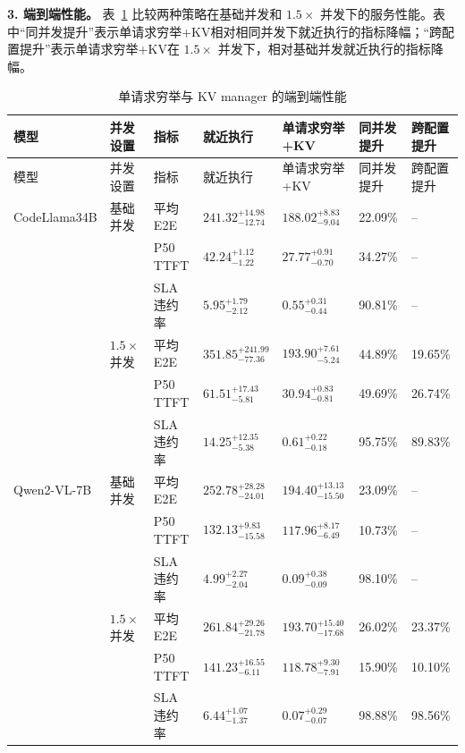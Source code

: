 \medskip
\noindent\textbf{3. 端到端性能。}
表~\ref{tab:offloading-preliminary-results} 比较两种策略在基础并发和 \(1.5\times\) 并发下的服务性能。表中“同并发提升”表示单请求穷举+KV相对相同并发下就近执行的指标降幅；“跨配置提升”表示单请求穷举+KV在 \(1.5\times\) 并发下，相对基础并发就近执行的指标降幅。

\begingroup
\scriptsize
\setlength{\tabcolsep}{2pt}
\begin{longtable}{p{}p{}>{\raggedright\arraybackslash}p{}p{}p{}p{}p{}}
\caption{单请求穷举与 KV manager 的端到端性能}
\label{tab:offloading-preliminary-results}\\
\toprule
模型 & 并发设置 & 指标 & 就近执行 & 单请求穷举+KV & 同并发提升 & 跨配置提升 \\
\midrule
\endfirsthead
\toprule
模型 & 并发设置 & 指标 & 就近执行 & 单请求穷举+KV & 同并发提升 & 跨配置提升 \\
\midrule
\endhead
CodeLlama34B
& 基础并发 & 平均 E2E & \(241.32_{-12.74}^{+14.98}\) & \(188.02_{-9.04}^{+8.83}\) & 22.09\% & -- \\
& & P50 TTFT & \(42.24_{-1.22}^{+1.12}\) & \(27.77_{-0.70}^{+0.91}\) & 34.27\% & -- \\
& & SLA 违约率 & \(5.95_{-2.12}^{+1.79}\) & \(0.55_{-0.44}^{+0.31}\) & 90.81\% & -- \\
& \(1.5\times\) 并发 & 平均 E2E & \(351.85_{-77.36}^{+241.99}\) & \(193.90_{-5.24}^{+7.61}\) & 44.89\% & 19.65\% \\
& & P50 TTFT & \(61.51_{-5.81}^{+17.43}\) & \(30.94_{-0.81}^{+0.83}\) & 49.69\% & 26.74\% \\
& & SLA 违约率 & \(14.25_{-5.38}^{+12.35}\) & \(0.61_{-0.18}^{+0.22}\) & 95.75\% & 89.83\% \\
\midrule
Qwen2-VL-7B
& 基础并发 & 平均 E2E & \(252.78_{-24.01}^{+28.28}\) & \(194.40_{-15.50}^{+13.13}\) & 23.09\% & -- \\
& & P50 TTFT & \(132.13_{-15.58}^{+9.83}\) & \(117.96_{-6.49}^{+8.17}\) & 10.73\% & -- \\
& & SLA 违约率 & \(4.99_{-2.04}^{+2.27}\) & \(0.09_{-0.09}^{+0.38}\) & 98.10\% & -- \\
& \(1.5\times\) 并发 & 平均 E2E & \(261.84_{-21.78}^{+29.26}\) & \(193.70_{-17.68}^{+15.40}\) & 26.02\% & 23.37\% \\
& & P50 TTFT & \(141.23_{-6.11}^{+16.55}\) & \(118.78_{-7.91}^{+9.30}\) & 15.90\% & 10.10\% \\
& & SLA 违约率 & \(6.44_{-1.37}^{+1.07}\) & \(0.07_{-0.07}^{+0.29}\) & 98.88\% & 98.56\% \\
\bottomrule
\end{longtable}
\endgroup

